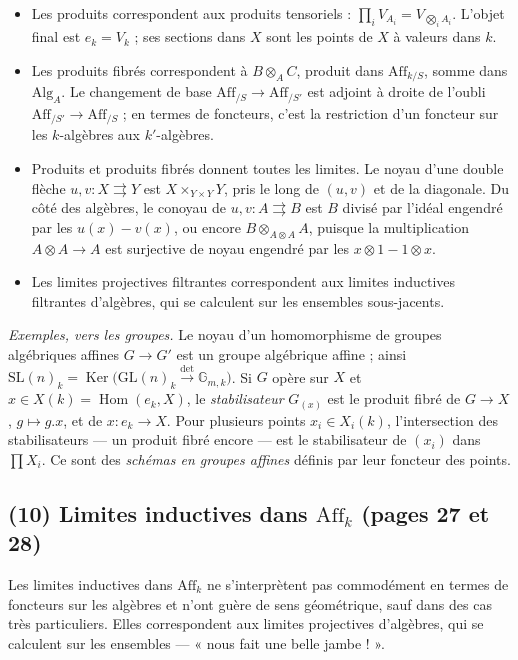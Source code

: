 \documentclass[11pt,a4paper]{article}
\begin{document}
\begin{itemize}
  \item Les produits correspondent aux produits tensoriels :
  $\prod_i V_{A_i} = V_{\bigotimes_i A_i}$. L'objet final est $e_k = V_k$ ; ses
  sections dans $X$ sont les points de $X$ à valeurs dans $k$.
  \item Les produits fibrés correspondent à $B \otimes_A C$, produit dans
  $\mathrm{Aff}_{k/S}$, somme dans $\mathrm{Alg}_A$. Le changement de base
  $\mathrm{Aff}_{/S} \to \mathrm{Aff}_{/S'}$ est adjoint à droite de l'oubli
  $\mathrm{Aff}_{/S'} \to \mathrm{Aff}_{/S}$ ; en termes de foncteurs, c'est la
  restriction d'un foncteur sur les $k$-algèbres aux $k'$-algèbres.
  \item Produits et produits fibrés donnent toutes les limites. Le noyau d'une
  double flèche $u, v : X \rightrightarrows Y$ est
  $X \times_{Y \times Y} Y$, pris le long de $(u, v)$ et de la diagonale. Du
  côté des algèbres, le conoyau de $u, v : A \rightrightarrows B$ est $B$ divisé
  par l'idéal engendré par les $u(x) - v(x)$, ou encore
  $B \otimes_{A \otimes A} A$, puisque la multiplication
  $A \otimes A \to A$ est surjective de noyau engendré par les
  $x \otimes 1 - 1 \otimes x$.
  \item Les limites projectives filtrantes correspondent aux limites
  inductives filtrantes d'algèbres, qui se calculent sur les ensembles
  sous-jacents.
\end{itemize}

\emph{Exemples, vers les groupes.} Le noyau d'un homomorphisme de groupes
algébriques affines $G \to G'$ est un groupe algébrique affine ; ainsi
$\mathrm{SL}(n)_k = \operatorname{Ker}\bigl(\mathrm{GL}(n)_k \xrightarrow{\det} \mathbb{G}_{m,k}\bigr)$.
Si $G$ opère sur $X$ et $x \in X(k) = \operatorname{Hom}(e_k, X)$, le
\emph{stabilisateur} $G_{(x)}$ est le produit fibré de $G \to X$,
$g \mapsto g.x$, et de $x : e_k \to X$. Pour plusieurs points $x_i \in X_i(k)$,
l'intersection des stabilisateurs --- un produit fibré encore --- est le
stabilisateur de $(x_i)$ dans $\prod X_i$. Ce sont des \emph{schémas en groupes
affines} définis par leur foncteur des points.

\subsection*{(10) Limites inductives dans $\mathrm{Aff}_k$ (pages 27 et 28)}

Les limites inductives dans $\mathrm{Aff}_k$ ne s'interprètent pas commodément
en termes de foncteurs sur les algèbres et n'ont guère de sens géométrique,
sauf dans des cas très particuliers. Elles correspondent aux limites projectives
d'algèbres, qui se calculent sur les ensembles --- « nous fait une belle
jambe ! ».
\end{document}
